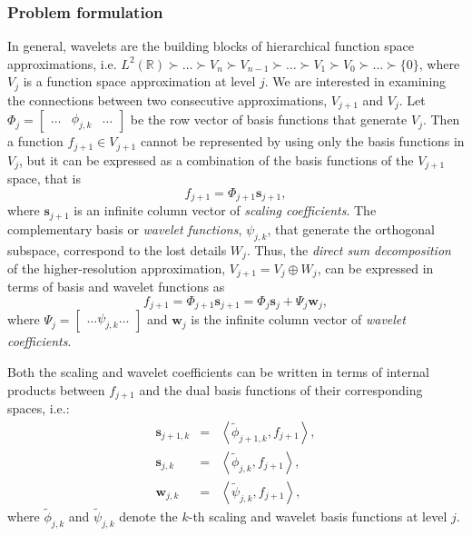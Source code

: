 \documentclass[graybox]{svmult}
\begin{document}
	\subsubsection{Problem formulation}
	In general, wavelets are the building blocks of hierarchical function space approximations, i.e. $L^2(\mathbb{R}) \succ \ldots \succ V_n \succ V_{n-1} \succ \ldots \succ V_{1} \succ V_{0} \succ \ldots \succ \{0\}$, where $V_{j}$ is a function space approximation at level $j$. We are interested in examining the connections between two consecutive approximations, $V_{j+1}$ and $V_{j}$. Let $\Phi_j = \begin{bmatrix} \ldots & \phi_{j,k} & \ldots \end{bmatrix}$ be the row vector of basis functions that generate $V_j$. Then a function $f_{j+1} \in V_{j+1}$ cannot be represented by using only the basis functions in $V_{j}$, but it can be expressed as a combination of the basis functions of the $V_{j+1}$ space, that is
	\begin{equation}
	f_{j+1} = \Phi_{j+1} \mathbf{s}_{j+1},
	\label{eq_cds:f_in_j_plus_one}
	\end{equation}
	where $\mathbf{s}_{j+1}$ is an infinite column vector of \emph{scaling coefficients}. The  complementary basis or \emph{wavelet functions}, $\psi_{j,k}$, that generate the orthogonal subspace, correspond to the lost details $W_j$. Thus, the \emph{direct sum decomposition} of the higher-resolution approximation, $V_{j+1} = V_j \oplus W_j$,  can be expressed in terms of basis and wavelet functions as
	\begin{equation}
	f_{j+1} = \Phi_{j+1}\mathbf{s}_{j+1} = \Phi_j \mathbf{s}_j + \Psi_j \mathbf{w}_j,
	\label{eq_cds:f_in_j}
	\end{equation} 
	where $\Psi_j = \begin{bmatrix} \ldots \psi_{j,k} \ldots \end{bmatrix}$ and $\mathbf{w}_j$ is the infinite column vector of \emph{wavelet coefficients}.
	
	
	Both the scaling and wavelet coefficients can be written in terms of internal products between $f_{j+1}$ and the dual basis functions of their corresponding spaces, i.e.:
	\begin{eqnarray}
	\mathbf{s}_{j+1,k} & = & \left< \tilde{\phi}_{j+1,k}, f_{j+1} \right>,
	\label{eq_cds:inner1}\\
	\mathbf{s}_{j,k} & = & \left< \tilde{\phi}_{j,k}, f_{j+1} \right>, \label{eq_cds:inner2}\\
	\mathbf{w}_{j,k} & = & \left< \tilde{\psi}_{j,k}, f_{j+1} \right>,
	\label{eq_cds:inner3}
	\end{eqnarray}
	where $\tilde{\phi}_{j,k}$ and $ \tilde{\psi}_{j,k}$ denote the $k$-th scaling and wavelet basis functions at level $j$.
	
\end{document}
